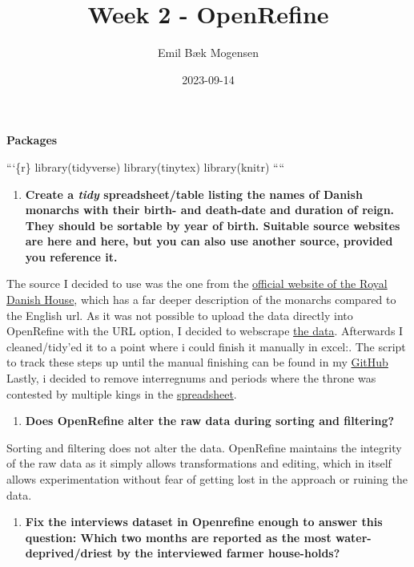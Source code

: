 \documentclass[
]{article}
\title{Week 2 - OpenRefine}
\author{Emil Bæk Mogensen}
\date{2023-09-14}
\providecommand{\tightlist}{%
  \setlength{\itemsep}{0pt}\setlength{\parskip}{0pt}}
\begin{document}
\maketitle

\textbf{Packages}

```\{r\} library(tidyverse) library(tinytex) library(knitr) ````

\begin{enumerate}
\def\labelenumi{\arabic{enumi})}
\tightlist
\item
  \textbf{Create a \emph{tidy} spreadsheet/table listing the names of
  Danish monarchs with their birth- and death-date and duration of
  reign. They should be sortable by year of birth. Suitable source
  websites are here and here, but you can also use another source,
  provided you reference it.}
\end{enumerate}

The source I decided to use was the one from the
\href{https://www.kongehuset.dk/monarkiet-i-danmark/kongerakken}{official
website of the Royal Danish House}, which has a far deeper description
of the monarchs compared to the English url. As it was not possible to
upload the data directly into OpenRefine with the URL option, I decided
to webscrape
\href{https://github.com/Emil3103/Digital-Methods/blob/main/Week_02/Data/danish_monarchs_data.csv}{the
data}. Afterwards I cleaned/tidy'ed it to a point where i could finish
it manually in excel:. The script to track these steps up until the
manual finishing can be found in my
\href{https://github.com/Emil3103/Digital-Methods/blob/main/Week_02/Scripts/danish_monarchs_openrefine}{GitHub}
Lastly, i decided to remove interregnums and periods where the throne
was contested by multiple kings in the
\href{https://github.com/Emil3103/Digital-Methods/blob/main/Week_02/danish_monarchs_sheet.xlsx}{spreadsheet}.

\begin{enumerate}
\def\labelenumi{\arabic{enumi})}
\setcounter{enumi}{1}
\tightlist
\item
  \textbf{Does OpenRefine alter the raw data during sorting and
  filtering?}
\end{enumerate}

Sorting and filtering does not alter the data. OpenRefine maintains the
integrity of the raw data as it simply allows transformations and
editing, which in itself allows experimentation without fear of getting
lost in the approach or ruining the data.

\begin{enumerate}
\def\labelenumi{\arabic{enumi})}
\setcounter{enumi}{2}
\tightlist
\item
  \textbf{Fix the interviews dataset in Openrefine enough to answer this
  question: Which two months are reported as the most
  water-deprived/driest by the interviewed farmer house-holds?}
\end{enumerate}
\end{document}
